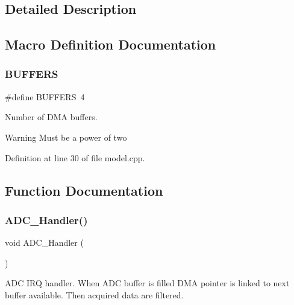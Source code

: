 \subsection{Detailed Description}


\subsection{Macro Definition Documentation}
\mbox{\label{group___board__model__group_gaabe0f927d44a09f458bd5fe5ab4e2f7f}} 
\subsubsection{\texorpdfstring{B\+U\+F\+F\+E\+RS}{BUFFERS}}
{\footnotesize\ttfamily \#define B\+U\+F\+F\+E\+RS~4}



Number of D\+MA buffers. 

\begin{DoxyWarning}{Warning}
Must be a power of two 
\end{DoxyWarning}


Definition at line 30 of file model.\+cpp.



\subsection{Function Documentation}
\mbox{\label{group___board__model__group_gaedc241164d501dcbc52cde232333c9cf}} 
\subsubsection{\texorpdfstring{A\+D\+C\+\_\+\+Handler()}{ADC\_Handler()}}
{\footnotesize\ttfamily void A\+D\+C\+\_\+\+Handler (\begin{DoxyParamCaption}{ }\end{DoxyParamCaption})}



A\+DC I\+RQ handler. When A\+DC buffer is filled D\+MA pointer is linked to next buffer available. Then acquired data are filtered. 

